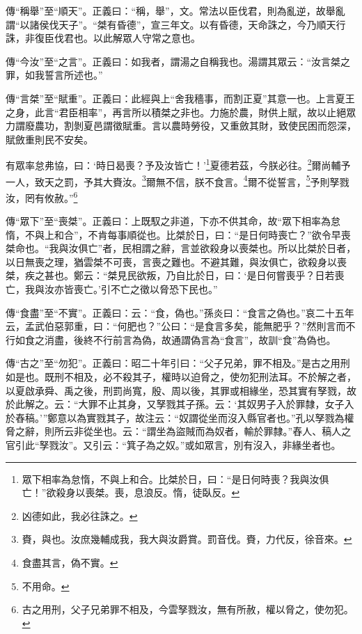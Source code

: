 {\noindent\zhuan{}\fzbyks 傳“稱舉”至“順天”。正義曰：“稱，舉”，文。常法以臣伐君，則為亂逆，故舉亂謂“以諸侯伐天子”。“桀有昏德”，宣三年文。以有昏德，天命誅之，今乃順天行誅，非復臣伐君也。以此解眾人守常之意也。 \par}

{\noindent\zhuan{}\fzbyks 傳“今汝”至“之言”。正義曰：如我者，謂湯之自稱我也。湯謂其眾云：“汝言桀之罪，如我誓言所述也。” \par}

{\noindent\zhuan{}\fzbyks 傳“言桀”至“賦重”。正義曰：此經與上“舍我穡事，而割正夏”其意一也。上言夏王之身，此言“君臣相率”，再言所以積桀之非也。力施於農，財供上賦，故以止絕眾力謂廢農功，割剝夏邑謂徵賦重。言以農時勞役，又重斂其財，致使民困而怨深，賦斂重則民不安矣。 \par}

有眾率怠弗協，曰：‘時日曷喪？予及汝皆亡！’\footnote{眾下相率為怠惰，不與上和合。比桀於日，曰：“是日何時喪？我與汝俱亡！”欲殺身以喪桀。喪，息浪反。惰，徒臥反。}夏德若茲，今朕必往。\footnote{凶德如此，我必往誅之。}爾尚輔予一人，致天之罰，予其大賚汝。\footnote{賚，與也。汝庶幾輔成我，我大與汝爵賞。罰音伐。賚，力代反，徐音來。}爾無不信，朕不食言。\footnote{食盡其言，偽不實。}爾不從誓言，\footnote{不用命。}予則孥戮汝，罔有攸赦。”\footnote{古之用刑，父子兄弟罪不相及，今雲孥戮汝，無有所赦，權以脅之，使勿犯。}

{\noindent\zhuan{}\fzbyks 傳“眾下”至“喪桀”。正義曰：上既馭之非道，下亦不供其命，故“眾下相率為怠惰，不與上和合”，不肯每事順從也。比桀於日，曰：“是日何時喪亡？”欲令早喪桀命也。“我與汝俱亡”者，民相謂之辭，言並欲殺身以喪桀也。所以比桀於日者，以日無喪之理，猶雲桀不可喪，言喪之難也。不避其難，與汝俱亡，欲殺身以喪桀，疾之甚也。鄭云：“桀見民欲叛，乃自比於日，曰：‘是日何嘗喪乎？日若喪亡，我與汝亦皆喪亡。’引不亡之徵以脅恐下民也。” \par}

{\noindent\zhuan{}\fzbyks 傳“食盡”至“不實”。正義曰：云：“食，偽也。”孫炎曰：“食言之偽也。”哀二十五年云，孟武伯惡郭重，曰：“何肥也？”公曰：“是食言多矣，能無肥乎？”然則言而不行如食之消盡，後終不行前言為偽，故通謂偽言為“食言”，故訓“食”為偽也。 \par}

{\noindent\zhuan{}\fzbyks 傳“古之”至“勿犯”。正義曰：昭二十年引曰：“父子兄弟，罪不相及。”是古之用刑如是也。既刑不相及，必不殺其子，權時以迫脅之，使勿犯刑法耳。不於解之者，以夏啟承舜、禹之後，刑罰尚寬，殷、周以後，其罪或相緣坐，恐其實有孥戮，故於此解之。云：“大罪不止其身，又孥戮其子孫。云：‘其奴男子入於罪隸，女子入於舂稿。’”鄭意以為實戮其子，故注云：“奴謂從坐而沒入縣官者也。”孔以孥戮為權脅之辭，則所云非從坐也。云：“謂坐為盜賊而為奴者，輸於罪隸。”舂人、稿人之官引此“孥戮汝”。又引云：“箕子為之奴。”或如眾言，別有沒入，非緣坐者也。 \par}

